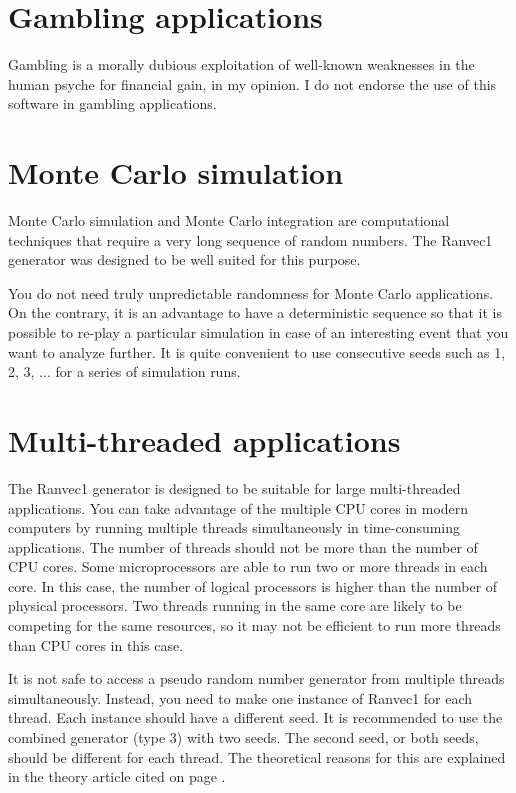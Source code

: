 \documentclass[11pt,a4paper,oneside,openright]{report}
\newcommand{\vspacesmall}{\vspace{3mm}}
\begin{document}
\section{Gambling applications}\label{GamblingApplications}
Gambling is a morally dubious exploitation of well-known weaknesses in the human psyche for financial gain, in my opinion. I do not endorse the use of this software in gambling applications.
\vspacesmall


\section{Monte Carlo simulation}\label{MonteCarloSimulation}
Monte Carlo simulation and Monte Carlo integration are computational techniques that require a very long sequence of random numbers. The Ranvec1 generator was designed to be well suited for this purpose. 
\vspacesmall

You do not need truly unpredictable randomness for Monte Carlo applications. On the contrary, it is an advantage to have a deterministic sequence so that it is possible to re-play a particular simulation in case of an interesting event that you want to analyze further. It is quite convenient to use consecutive seeds such as 1, 2, 3, ... for a series of simulation runs.
\vspacesmall


\section{Multi-threaded applications}\label{MultiThreadedApplications}
The Ranvec1 generator is designed to be suitable for large multi-threaded applications.
You can take advantage of the multiple CPU cores in modern computers by running multiple threads simultaneously in time-consuming applications. The number of threads should not be more than the number of CPU cores. Some microprocessors are able to run two or more threads in each core. In this case, the number of logical processors is higher than the number of physical processors.
Two threads running in the same core are likely to be competing for the same resources, so it may not be efficient to run more threads than CPU cores in this case.
\vspacesmall

It is not safe to access a pseudo random number generator from multiple threads simultaneously. Instead, you need to make one instance of Ranvec1 for each thread. Each instance should have a different seed. It is recommended to use the combined generator (type 3) with two seeds. The second seed, or both seeds, should be different for each thread. The theoretical reasons for this are explained in the theory article cited on page \pageref{Fog2015TheoryArticle}.
\vspacesmall
\end{document}
